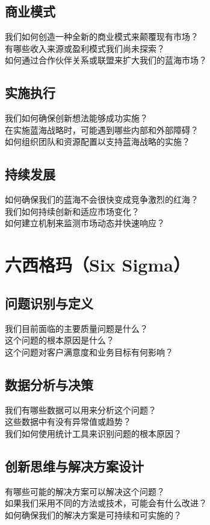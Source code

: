 \documentclass[12pt]{book}
\begin{document}
\subsection{商业模式}
我们如何创造一种全新的商业模式来颠覆现有市场？\\
有哪些收入来源或盈利模式我们尚未探索？\\
如何通过合作伙伴关系或联盟来扩大我们的蓝海市场？\\

\subsection{实施执行}
我们如何确保创新想法能够成功实施？\\
在实施蓝海战略时，可能遇到哪些内部和外部障碍？\\
如何组织团队和资源配置以支持蓝海战略的实施？\\

\subsection{持续发展}
如何确保我们的蓝海不会很快变成竞争激烈的红海？\\
我们如何持续创新和适应市场变化？\\
如何建立机制来监测市场动态并快速响应？\\


\section{六西格玛（Six Sigma）}
\subsection{问题识别与定义}
我们目前面临的主要质量问题是什么？\\
这个问题的根本原因是什么？\\
这个问题对客户满意度和业务目标有何影响？\\

\subsection{数据分析与决策}
我们有哪些数据可以用来分析这个问题？\\
这些数据中有没有异常值或趋势？\\
我们如何使用统计工具来识别问题的根本原因？\\

\subsection{创新思维与解决方案设计}
有哪些可能的解决方案可以解决这个问题？\\
如果我们采用不同的方法或技术，可能会有什么改进？\\
如何确保我们的解决方案是可持续和可实施的？\\
\end{document}
